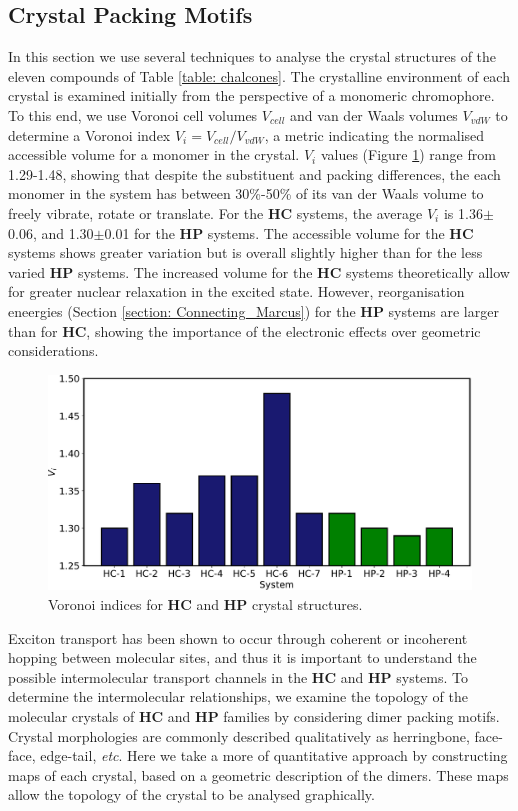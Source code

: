 \subsection{Crystal Packing Motifs} \label{section: Connecting_Motifs}
In this section we use several techniques to analyse the crystal structures of the eleven compounds of Table \ref{table: chalcones}. The crystalline environment of each crystal is examined initially from the perspective of a monomeric chromophore. To this end, we use Voronoi cell volumes $V_{cell}$ and van der Waals volumes $V_{vdW}$ to determine a Voronoi index $V_{i}=V_{cell}/V_{vdW}$, a metric indicating the normalised accessible volume for a monomer in the crystal. $V_{i}$ values (Figure \ref{figure: voronoi_index}) range from 1.29-1.48, showing that despite the substituent and packing differences, the each monomer in the system has between 30\%-50\% of its van der Waals volume to freely vibrate, rotate or translate. For the \textbf{HC} systems, the average $V_{i}$ is 1.36$\pm$0.06, and 1.30$\pm$0.01 for the \textbf{HP} systems. The accessible volume for the \textbf{HC} systems shows greater variation but is overall slightly higher than for the less varied \textbf{HP} systems. The increased volume for the \textbf{HC} systems theoretically allow for greater nuclear relaxation in the excited state. However, reorganisation eneergies (Section \ref{section: Connecting_Marcus}) for the \textbf{HP} systems are larger than for \textbf{HC}, showing the importance of the electronic effects over geometric considerations. 
\begin{figure}[t]
\centering
  \includegraphics[width=0.8\linewidth]{5ConnectingCrystalStructure/Voronoi_Index}
  \caption{Voronoi indices for \textbf{HC} and \textbf{HP} crystal structures.}
  \label{figure: voronoi_index}
\end{figure}

Exciton transport has been shown to occur through coherent or incoherent hopping between molecular sites, and thus it is important to understand the possible intermolecular transport channels in the \textbf{HC} and \textbf{HP} systems. To determine the intermolecular relationships, we examine the topology of the molecular crystals of \textbf{HC} and \textbf{HP} families by considering dimer packing motifs. Crystal morphologies are commonly described qualitatively as herringbone, face-face, edge-tail, \textit{etc}. Here we take a more of quantitative approach by constructing maps of each crystal, based on a geometric description of the dimers. These maps allow the topology of the crystal to be analysed graphically.

